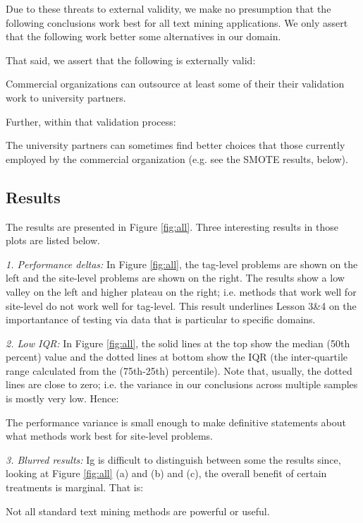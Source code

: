 \documentclass{sig-alternate-05-2015}
\theoremstyle{break}
\begin{document}
Due to these threats to external validity,   we make no presumption that the following conclusions work best   for all text mining applications. We only assert that the following   work better some
alternatives 
  in our domain.   
  
That said, we   assert that the following is   externally
valid:
\begin{lesson}
Commercial organizations can outsource
at least some of their 
their validation work to university partners.
\end{lesson}
Further, within that validation
process:
\begin{lesson}
The university partners can sometimes find
better choices that those currently employed by the commercial
organization (e.g. see the SMOTE results, below).
\end{lesson}



\subsection{  Results}
The results are 
presented in  Figure \ref{fig:all}.
Three interesting results in those plots are listed below.

{\em 1. Performance deltas:}  In Figure \ref{fig:all}, the
tag-level problems are shown on the left and the site-level problems are
shown on the right.  The results show a low valley on the left and higher plateau on the right; i.e.   methods that work well for site-level
do not work well for tag-level. This result underlines Lesson 3\&4 on the 
  importantance of testing via   data that is particular to specific domains.
 
{\em 2. Low IQR:} In  Figure \ref{fig:all},
the solid lines at the top show the median (50th percent) value
and the dotted lines at bottom show the IQR (the inter-quartile range calculated from the (75th-25th) percentile). Note that, usually, the dotted lines are close
to zero; i.e. the variance in our conclusions across multiple samples is mostly
very low. Hence:
\begin{lesson}
The performance variance is small enough to make  definitive statements about what methods work best for  site-level problems.
\end{lesson}

{\em 3. Blurred results:} Ig is difficult to distinguish between   some the  results since, looking at Figure \ref{fig:all} (a) and (b) and (c),   the overall benefit of certain treatments is marginal.
That is:
\begin{lesson}
Not all standard text mining methods are  powerful or useful.
\end{lesson}
\end{document}
